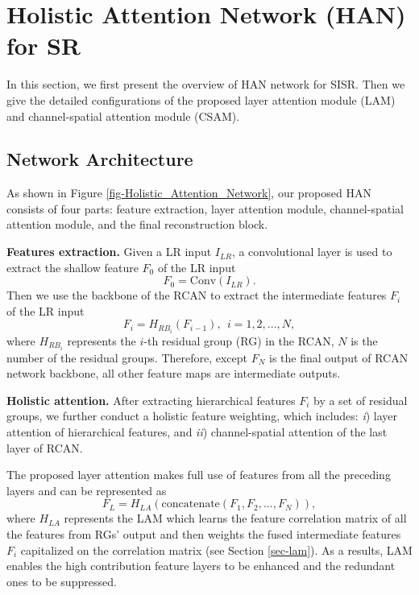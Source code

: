 \documentclass[runningheads]{llncs}
\begin{document}
\section{Holistic Attention Network (HAN) for SR}
\label{sec-att}
In this section, we first present the overview of HAN network for SISR. Then we give the detailed configurations of the proposed layer attention module (LAM) and channel-spatial attention module (CSAM).  




\subsection{Network Architecture}
As shown in Figure \ref{fig-Holistic_Attention_Network}, our proposed HAN consists of four parts: feature extraction, layer attention module, channel-spatial attention module, and the final reconstruction block.


\textbf{Features extraction.} Given a LR input $I_{LR}$, a convolutional layer is used to extract the shallow feature $F_0$ of the LR input
\begin{equation}
\mathit{F_0} = \text{Conv}(I_{LR}) .
\end{equation}
Then we use the backbone of the RCAN \cite{zhang2018image} to extract the intermediate features $F_i$ of the LR input
\begin{equation}
\mathit{F_{i}} = H_{RB_i}(F_{i-1}) , ~~i = 1,2,...,N ,
\end{equation}
where $H_{RB_i}$ represents the $i$-th residual group (RG) in the RCAN, $N$ is the number of the residual groups. Therefore, except $F_{N}$ is the final output of RCAN network backbone, all other feature maps are intermediate outputs.



\textbf{Holistic attention.} After extracting hierarchical features $F_i$ by a set of residual groups, we further conduct a holistic feature weighting, which includes: \textit{i}) layer attention of hierarchical features, and \textit{ii}) channel-spatial attention of the last layer of RCAN. 

The proposed layer attention makes full use of features from all the preceding layers and can be represented as
\begin{equation}
\mathit{F_{L}} = H_{LA}(\text{concatenate}(F_1, F_2, ..., F_N)) ,
\end{equation}
where $ H_{LA} $ represents the LAM which learns the feature correlation matrix of all the features from RGs' output and then weights the fused intermediate features $F_i$ capitalized on the correlation matrix (see Section \ref{sec-lam}). As a results, LAM enables the high contribution feature layers to be enhanced and the redundant ones to be suppressed.
\end{document}
